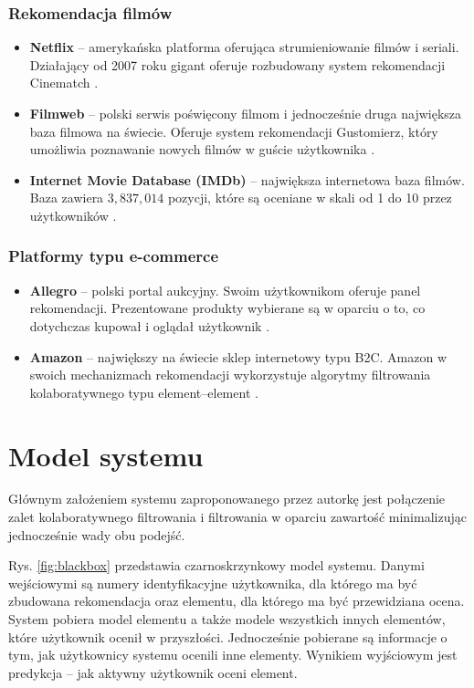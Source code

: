 \documentclass[twoside]{iisthesis}
\begin{document}
		 \subsection{Rekomendacja filmów}
		 \begin{itemize}
			 \item \textbf{Netflix} -- amerykańska platforma oferująca strumieniowanie filmów i seriali. Działający od 2007 roku gigant oferuje rozbudowany system rekomendacji Cinematch \cite{id:aStreamOfMovies}. 
			 \item \textbf{Filmweb} -- polski serwis poświęcony filmom i jednocześnie druga największa baza filmowa na świecie. Oferuje system rekomendacji Gustomierz, który umożliwia poznawanie nowych filmów w guście użytkownika \cite{id:filmwebfaq}.
			 \item \textbf{Internet Movie Database (IMDb)} -- największa internetowa baza filmów. Baza zawiera $3,837,014$ pozycji, które są oceniane w skali od 1 do 10 przez użytkowników \cite{id:imdbstats}.
		 \end{itemize}
		 
		 \subsection{Platformy typu e-commerce}
	
		\begin{itemize}
			 \item \textbf{Allegro} -- polski portal aukcyjny. Swoim użytkownikom oferuje panel rekomendacji. Prezentowane produkty wybierane są w oparciu o to, co dotychczas kupował i oglądał użytkownik \cite{id:allegrofaq}. 
			 \item \textbf{Amazon} -- największy na świecie sklep internetowy typu B2C. Amazon w swoich mechanizmach rekomendacji wykorzystuje algorytmy filtrowania kolaboratywnego typu element--element \cite{id:linden2003amazon}.
		 \end{itemize}	 
	  
 
 \chapter{Model systemu}
 
 Głównym założeniem systemu zaproponowanego przez autorkę jest połączenie zalet kolaboratywnego filtrowania i filtrowania w oparciu zawartość minimalizując jednocześnie wady obu podejść. 
 
 Rys. \ref{fig:blackbox} przedstawia czarnoskrzynkowy model systemu. Danymi wejściowymi są numery identyfikacyjne użytkownika, dla którego ma być zbudowana rekomendacja oraz elementu, dla którego ma być przewidziana ocena. System pobiera model elementu a także modele wszystkich innych elementów, które użytkownik ocenił w przyszłości. Jednocześnie pobierane są informacje o tym, jak użytkownicy systemu ocenili inne elementy. Wynikiem wyjściowym jest predykcja -- jak aktywny użytkownik oceni element.
 
\end{document}
